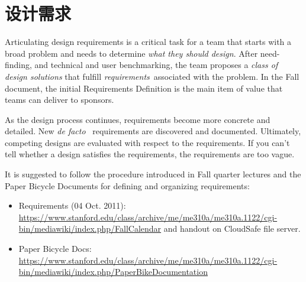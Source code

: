 \chapter{设计需求}
\label{sec-requirements}

\begin{remark} \color{blue}
Articulating design requirements is a critical task for a team that starts with a broad problem and needs to determine \emph{what they should design}. After need-finding, and technical and user benchmarking, the team proposes a {\em class of design solutions} that fulfill {\em requirements}\, associated with the problem. In the Fall document, the initial Requirements Definition is the main item of value that teams can deliver to sponsors.

As the design process continues, requirements become more concrete and detailed. New {\em de facto} \, requirements are discovered and documented. Ultimately, competing designs are evaluated with respect to the requirements. If you can't tell whether a design satisfies the requirements, the requirements are too vague.

It is suggested to follow the procedure introduced in Fall quarter lectures and the Paper Bicycle Documents for defining and organizing requirements:
\begin{itemize}\tightlist
\item Requirements (04 Oct. 2011): \url{https://www.stanford.edu/class/archive/me/me310a/me310a.1122/cgi-bin/mediawiki/index.php/FallCalendar} and handout on CloudSafe file server.
\item Paper Bicycle Docs: \url{https://www.stanford.edu/class/archive/me/me310a/me310a.1122/cgi-bin/mediawiki/index.php/PaperBikeDocumentation}
\end{itemize}
\normalcolor
\end{remark}



